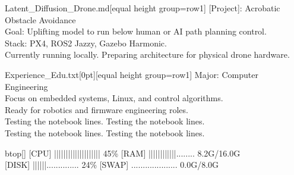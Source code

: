\twmhline 

\begin{twmwindow}{Latent\_Diffusion\_Drone.md}[equal height group=row1]
    \textcolor{promptgreen}{[Project]:} Acrobatic Obstacle Avoidance\\
    \textcolor{promptblue}{Goal:} Uplifting model to run below human or AI path planning control.\\
    \textcolor{promptblue}{Stack:} PX4, ROS2 Jazzy, Gazebo Harmonic.\\
    Currently running locally. Preparing architecture for physical drone hardware.
\end{twmwindow}%
\twmgap 
\begin{twmnotebook}{Experience\_Edu.txt}[0pt][equal height group=row1]
    Major: Computer Engineering\\
    Focus on embedded systems, Linux, and control algorithms.\\
    Ready for robotics and firmware engineering roles.\\
    Testing the notebook lines. Testing the notebook lines.\\
    Testing the notebook lines. Testing the notebook lines.\\
\end{twmnotebook}

\twmhline 

\begin{twmwindow}[\dimexpr \textwidth-2pt\relax]{btop}[]
    [CPU]  |||||||||||||||||||| 45\% \hfill [RAM]  ||||||||||||........ 8.2G/16.0G \\
    {[DISK]} ||||||.............. 24\% \hfill [SWAP] .................... 0.0G/8.0G 
\end{twmwindow}

\twmhline

